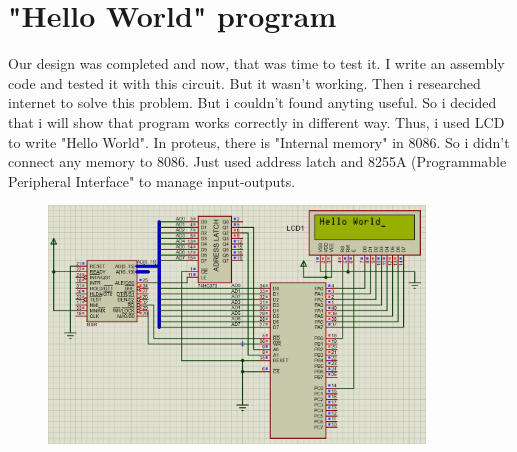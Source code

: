 \documentclass[11pt]{article}
\begin{document}
\section{"Hello World" program}
Our design was completed and now, that was time to test it. I write an assembly code and tested it with this circuit. But it wasn't working. Then i researched internet to solve this problem. But i couldn't found anyting useful. So i decided that i will show that program works correctly in different way. Thus, i used LCD to write "Hello World". 
\newline In proteus, there is "Internal memory" in 8086. So i didn't connect any memory to 8086. Just used address latch and 8255A (Programmable Peripheral Interface" to manage input-outputs. 
\begin{figure}[h!]
        \centering
        \includegraphics[width=10cm]{LCD.png}
        \label{fig:LCD}
\end{figure}
\end{document}
